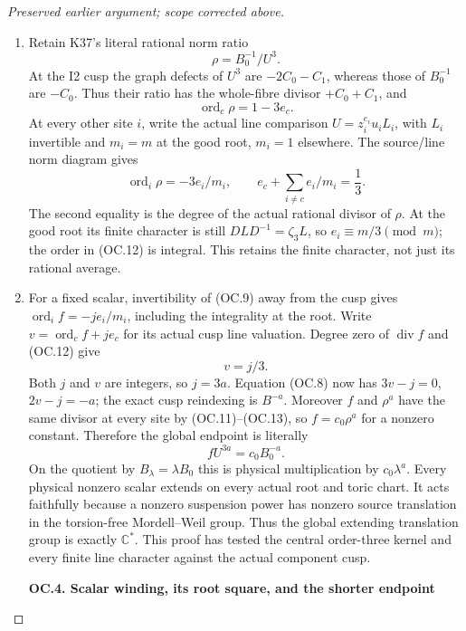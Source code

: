 \begin{proof}[Preserved earlier argument; scope corrected above]
\begin{enumerate}[label=\arabic*.]
\item Retain K37's literal rational norm ratio
\[
                   \rho=B_0^{-1}/U^3.                    \tag{OC.10}
\]
At the I2 cusp the graph defects of \(U^3\) are
\(-2C_0-C_1\), whereas those of \(B_0^{-1}\) are
\(-C_0\). Thus their ratio has the whole-fibre divisor
\(+C_0+C_1\), and
\[
                  \operatorname{ord}_c\rho=1-3e_c.       \tag{OC.11}
\]
At every other site \(i\), write the actual line comparison
\(U=z_i^{e_i}u_i L_i\), with \(L_i\) invertible and
\(m_i=m\) at the good root, \(m_i=1\) elsewhere. The
source/line norm diagram gives
\[
 \operatorname{ord}_i\rho=-3e_i/m_i,\qquad
             e_c+\sum_{i\ne c}e_i/m_i=\frac13.           \tag{OC.12}
\]
The second equality is the degree of the actual rational divisor
of \(\rho\). At the good root its finite character is still
\(DLD^{-1}=\zeta_3L\), so \(e_i\equiv m/3\pmod m\);
the order in (OC.12) is integral. This retains the finite character,
not just its rational average.

\item For a fixed scalar, invertibility of (OC.9) away from the cusp
gives \(\operatorname{ord}_i f=-je_i/m_i\), including the
integrality at the root. Write
\(v=\operatorname{ord}_c f+je_c\) for its actual cusp line
valuation. Degree zero of \(\operatorname{div}f\) and
(OC.12) give
\[
                              v=j/3.                     \tag{OC.13}
\]
Both \(j\) and \(v\) are integers, so \(j=3a\).
Equation (OC.8) now has \(3v-j=0\), \(2v-j=-a\);
the exact cusp reindexing is \(B^{-a}\). Moreover \(f\)
and \(\rho^a\) have the same divisor at every site by
(OC.11)--(OC.13), so \(f=c_0\rho^a\) for a nonzero
constant. Therefore the global endpoint is literally
\[
                       fU^{3a}=c_0B_0^{-a}.              \tag{OC.14}
\]
On the quotient by \(B_\lambda=\lambda B_0\) this is
physical multiplication by \(c_0\lambda^a\). Every physical
nonzero scalar extends on every actual root and toric chart.
It acts faithfully because a nonzero suspension power has nonzero
source translation in the torsion-free Mordell--Weil group. Thus
the global extending translation group is exactly \(\mathbb C^*\).
This proof has tested the central order-three kernel and every finite
line character against the actual component cusp.

\par

\medskip\noindent\textbf{OC.4. Scalar winding, its root square, and the shorter endpoint}

\par\nobreak


\end{enumerate}
\end{proof}

